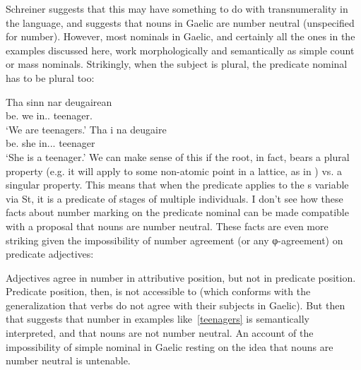 \documentclass[output=paper]{langsci/langscibook}
\begin{document}
Schreiner suggests that this may have something to do with transnumerality in
the language, and suggests that nouns in Gaelic are number neutral (unspecified
for number). However, most nominals in Gaelic, and certainly all the ones in
the examples discussed here, work morphologically and semantically as simple
count or mass nominals. Strikingly, when the subject is plural, the predicate
nominal has to be plural too:

\ea {} \label{teenagers}
\ea \gll  Tha sinn nar deugairean\\
be.\Prs{} we in.\Poss.\Fpl{} teenager.\Pl{}\\
\glt \enquote*{We are teenagers.}
\ex \gll Tha i na deugaire\\
be.\Prs{} she in.\Poss.\Tsg.\glossF{} teenager \\
\glt \enquote*{She is a teenager.}
\z \z
We can make sense of this if the root, in fact, bears a plural property (e.g.
it will apply to some non-atomic point in a lattice, as in \cite{Link:1983}) vs.
a singular property. This means that when the predicate applies to the s
variable via St, it is a predicate of stages of multiple individuals. I don't
see how these facts about number marking on the predicate nominal can be made
compatible with a proposal that nouns are number neutral. These facts are even
more striking given the impossibility of number agreement (or any
φ-agreement) on predicate adjectives:

\ea {} \label{number}
    \z
\z
Adjectives agree in number in attributive position, but not in
predicate position. Predicate position, then, is not accessible to 
(which conforms with the generalization that verbs do not agree with their
subjects in Gaelic). But then that suggests that number in examples
like~\eqref{teenagers} is semantically interpreted, and that nouns are not number
neutral. An account of the impossibility of simple nominal  in Gaelic resting on the idea that nouns are number neutral is untenable.
\end{document}
